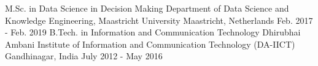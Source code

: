 
\begin{cventries}
    \cventry
      {M.Sc. in Data Science in Decision Making}
      {Department of Data Science and Knowledge Engineering, Maastricht University}
      {Maastricht, Netherlands}
      {Feb. 2017 - Feb. 2019}
      {}
  \cventry
    {B.Tech. in Information and Communication Technology}
    {Dhirubhai Ambani Institute of Information and Communication Technology (DA-IICT)}
    {Gandhinagar, India}
    {July 2012 - May 2016}
    {
    }
\end{cventries}
